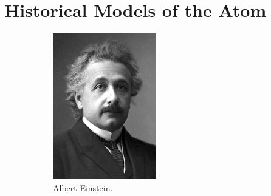 \documentclass[a4paper]{amsbook}
\theoremstyle{definition}
\numberwithin{exercise}{chapter}
\numberwithin{exercise}{chapter}
\begin{document}
\section{Historical Models of the Atom}
\begin{figure}
  \centering
  \begin{subfigure}{0.4\textwidth}
    \includegraphics[width = \textwidth]{einstein}
    \caption{Albert Einstein. \label{fig:einstein}}
  \end{subfigure}\hfill%
  \begin{subfigure}{0.4\textwidth}

\end{subfigure}
\end{figure}
\end{document}
